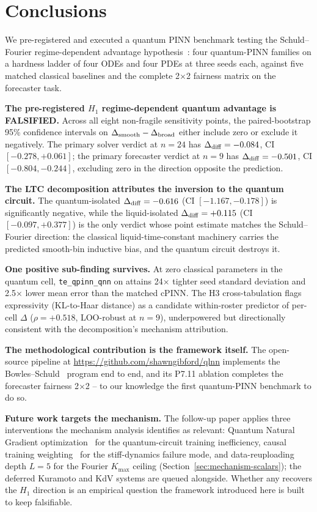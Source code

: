 
\section{Conclusions}
\label{sec:conclusions}

We pre-registered and executed a quantum PINN benchmark testing the
Schuld--Fourier regime-dependent advantage
hypothesis~\cite{schuld2022right,schuld2021effect}: four quantum-PINN
families on a hardness ladder of four ODEs and four PDEs at three seeds
each, against five matched classical baselines and the complete
2$\times$2 fairness matrix on the forecaster task.

\textbf{The pre-registered $H_1$ regime-dependent quantum
advantage is FALSIFIED.} Across all eight non-fragile sensitivity
points, the paired-bootstrap 95\% confidence intervals on
$\Delta_{\mathrm{smooth}} - \Delta_{\mathrm{broad}}$ either include zero or exclude it negatively. The
primary solver verdict at $n = 24$ has $\Delta_{\mathrm{diff}} = -0.084$, CI
$[-0.278, +0.061]$; the primary forecaster verdict at $n = 9$ has
$\Delta_{\mathrm{diff}} = -0.501$, CI $[-0.804, -0.244]$, excluding zero in the
direction opposite the prediction.

\textbf{The LTC decomposition attributes the inversion to the quantum
circuit.} The quantum-isolated $\Delta_{\mathrm{diff}} = -0.616$ (CI $[-1.167, -0.178]$)
is significantly negative, while the liquid-isolated
$\Delta_{\mathrm{diff}} = +0.115$ (CI $[-0.097, +0.377]$) is the only verdict whose
point estimate matches the Schuld--Fourier direction: the classical
liquid-time-constant machinery carries the predicted smooth-bin
inductive bias, and the quantum circuit destroys it.

\textbf{One positive sub-finding survives.} At zero classical
parameters in the quantum cell, \texttt{te\_qpinn\_qnn} on \fhn{}
attains 24$\times$ tighter seed standard deviation and 2.5$\times$ lower
mean error than the matched cPINN. The H3 cross-tabulation flags
expressivity (KL-to-Haar distance) as a candidate within-roster
predictor of per-cell $\Delta$ ($\rho = +0.518$, LOO-robust at
$n = 9$), underpowered but directionally consistent with the
decomposition's mechanism attribution.

\textbf{The methodological contribution is the framework itself.} The
open-source pipeline at \url{https://github.com/shawngibford/qlnn}
implements the Bowles--Schuld~\cite{bowles2024better} program end to
end, and its P7.11 ablation completes the forecaster fairness
2$\times$2 -- to our knowledge the first quantum-PINN benchmark to do so.

\textbf{Future work targets the mechanism.} The follow-up paper applies
three interventions the mechanism analysis identifies as relevant:
Quantum Natural Gradient optimization~\cite{stokes2020quantum} for the
quantum-circuit training inefficiency, causal training
weighting~\cite{wang2022causality} for the stiff-dynamics failure mode,
and data-reuploading depth $L = 5$ for the Fourier $K_{\max}$ ceiling
(Section~\ref{sec:mechanism-scalars}); the deferred Kuramoto and KdV
systems are queued alongside. Whether any recovers the $H_1$ direction
is an empirical question the framework introduced here is built to keep
falsifiable.
